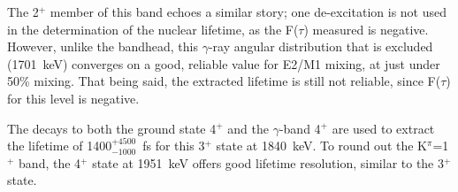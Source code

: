 The 2$^+$ member of this band echoes a similar story; one de-excitation is not used in the determination of the nuclear lifetime, as the F($\tau$) measured is negative. However, unlike the bandhead, this $\gamma$-ray angular distribution that is excluded (1701~keV) converges on a good, reliable value for E2/M1 mixing, at just under 50\% mixing. That being said, the extracted lifetime is still not reliable, since F($\tau$) for this level is negative. 

The decays to both the ground state 4$^+$ and the $\gamma$-band 4$^+$ are used to extract the lifetime of 1400$^{+4500}_{-1000}$~fs for this 3$^+$ state at 1840~keV. To round out the K$^\pi$=1$^+$ band, the 4$^+$ state at 1951~keV offers good lifetime resolution, similar to the 3$^+$ state.


